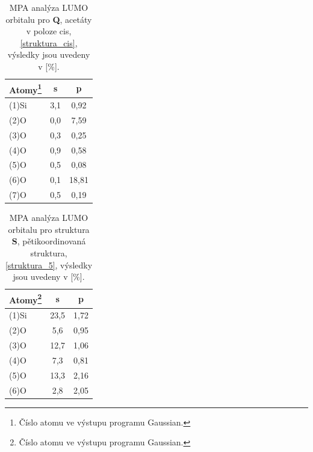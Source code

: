 \documentclass[
  digital, %
  table,   %
  lof,     %
  lot,     %
  oneside,
]{fithesis3}
\begin{document}
\begin{table}[htbp]\begin{minipage}{\textwidth}
\caption{MPA analýza LUMO orbitalu pro \textbf{Q}, acetáty v poloze cis, \ref{struktura_cis}, výsledky jsou uvedeny v [\%].}
\begin{center}
\begin{tabular}{|l|c|c|}
\hline
 \label{struktura_C_cis_MPA}Atomy\footnote{Číslo atomu ve výstupu programu Gaussian.} & s &p \\ \hline
(1)Si & 3,1  & 0,92   \\ \hline
(2)O & 0,0  & 7,59   \\ \hline
(3)O & 0,3  & 0,25   \\ \hline
(4)O & 0,9  & 0,58   \\ \hline
(5)O & 0,5  & 0,08   \\ \hline
(6)O & 0,1  & 18,81   \\ \hline
(7)O & 0,5  & 0,19   \\ \hline
\end{tabular}
\end{center}\end{minipage}
\end{table}

\begin{table}[htbp]\begin{minipage}{\textwidth}
\caption{MPA analýza LUMO orbitalu  pro struktura \textbf{S}, pětikoordinovaná struktura, \ref{struktura_5}, výsledky jsou uvedeny v [\%].}
\begin{center}
\begin{tabular}{|l|c|c|}
\hline
 \label{struktura_5_MPA}Atomy\footnote{Číslo atomu ve výstupu programu Gaussian.}& s & p \\ \hline
 (1)Si & 23,5  & 1,72   \\ \hline
 (2)O & 5,6  & 0,95   \\ \hline
 (3)O & 12,7  & 1,06   \\ \hline
 (4)O & 7,3  & 0,81   \\ \hline
 (5)O & 13,3  & 2,16   \\ \hline
 (6)O & 2,8  & 2,05   \\ \hline
\end{tabular}
\end{center}\end{minipage}
\end{table}
\end{document}
